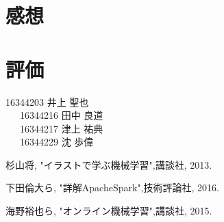 \documentclass[a4paper,12pt]{jarticle}
\begin{document}
\section{感想}

\section{評価}
16344203 井上 聖也\\
~~~16344216 田中 良道\\
~~~16344217 津上 祐典\\
~~~16344229 沈 歩偉

\begin{thebibliography}{99}

  杉山将,
		 "イラストで学ぶ機械学習",講談社, 2013.

 下田倫大ら,
		"詳解ApacheSpark",技術評論社, 2016.

  海野裕也ら,
		 "オンライン機械学習",講談社, 2015.

\end{thebibliography}
\end{document}
